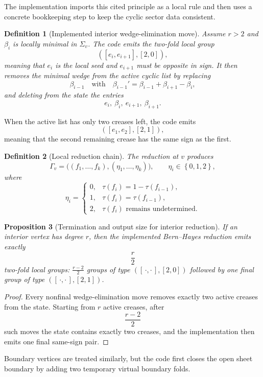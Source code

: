 \documentclass[11pt]{article}
\newtheorem{definition}{Definition}[section]
\newtheorem{proposition}[definition]{Proposition}
\theoremstyle{remark}
\newcommand{\set}[1]{\left\{ #1 \right\}}
\begin{document}
The implementation imports this cited principle as a local rule and then uses a
concrete bookkeeping step to keep the cyclic sector data consistent.

\begin{definition}[Implemented interior wedge-elimination move]
Assume $r>2$ and $\beta_i$ is locally minimal in $\Sigma_v$. The code emits the
two-fold local group
\[
([e_i,e_{i+1}],[2,0]),
\]
meaning that $e_i$ is the local seed and $e_{i+1}$ must be opposite in sign.
It then removes the minimal wedge from the active cyclic list by replacing
\[
\beta_{i-1}
\quad\text{with}\quad
\beta_{i-1}'=\beta_{i-1}+\beta_{i+1}-\beta_i,
\]
and deleting from the state the entries
\[
e_i,\ \beta_i,\ e_{i+1},\ \beta_{i+1}.
\]
\end{definition}

When the active list has only two creases left, the code emits
\[
([e_1,e_2],[2,1]),
\]
meaning that the second remaining crease has the same sign as the first.

\begin{definition}[Local reduction chain]
The reduction at $v$ produces
\[
\Gamma_v=\bigl((f_1,\dots,f_k),(\eta_1,\dots,\eta_k)\bigr),
\qquad
\eta_i\in\set{0,1,2},
\]
where
\[
\eta_i=
\begin{cases}
0,& \tau(f_i)=1-\tau(f_{i-1}),\\
1,& \tau(f_i)=\tau(f_{i-1}),\\
2,& \tau(f_i)\text{ remains undetermined}.
\end{cases}
\]
\end{definition}

\begin{proposition}[Termination and output size for interior reduction]
If an interior vertex has degree $r$, then the implemented Bern--Hayes
reduction emits exactly
\[
\frac{r}{2}
\]
two-fold local groups: $\frac{r-2}{2}$ groups of type $([\,\cdot,\cdot\,],[2,0])$
followed by one final group of type $([\,\cdot,\cdot\,],[2,1])$.
\end{proposition}

\begin{proof}
Every nonfinal wedge-elimination move removes exactly two active creases from
the state. Starting from $r$ active creases, after
\[
\frac{r-2}{2}
\]
such moves the state contains exactly two creases, and the implementation then
emits one final same-sign pair.
\end{proof}

Boundary vertices are treated similarly, but the code first closes the open
sheet boundary by adding two temporary virtual boundary folds.
\end{document}
